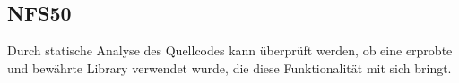 \subsection*{NFS50}
Durch \gls{statische Analyse} des \Gls{Quellcode}s kann überprüft werden, ob eine erprobte und bewährte \Gls{Library} verwendet wurde,
die diese Funktionalität mit sich bringt.